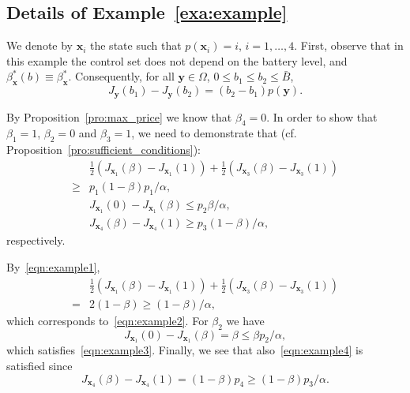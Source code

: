 \documentclass[journal]{IEEEtran}
\newcommand{\Bmax}{\bar{B}}
\newcommand{\bfx}{\boldsymbol x}
\newcommand{\bfy}{\boldsymbol y}
\newcommand\1{\mathbf{1}}
\begin{document}
\subsection{Details of Example~\ref{exa:example}}\label{sec:details_example}

We denote by $\bfx_i$ the state such that $p(\bfx_i) = i$, $i = 1,\dots,4$. First, observe that in this example the control set does not depend on the battery level, and $\beta_{\bfx}^*(b) \equiv \beta_{\bfx}^*$. Consequently, for all $\bfy \in \Omega$, $0 \le b_1 \le b_2 \le \Bmax$,
\begin{equation}
J_{\bfy}(b_1) - J_{\bfy}(b_2) = (b_2 - b_1)p(\bfy). \label{eqn:example1}
\end{equation}

By Proposition~\ref{pro:max_price} we know that $\beta_4 = 0$. In order to show that $\beta_1 = 1$, $\beta_2 = 0$ and $\beta_3 = 1$, we need to demonstrate that (cf. Proposition~\ref{pro:sufficient_conditions}):
\begin{align}
\nonumber &\frac{1}{2}(J_{\bfx_1}(\beta) - J_{\bfx_1}(1)) + \frac{1}{2}(J_{\bfx_3}(\beta) - J_{\bfx_3}(1))\\
\ge{}& p_1(1 - \beta) p_1/\alpha,\label{eqn:example2}\\
&J_{\bfx_1}(0) - J_{\bfx_1}(\beta) \le p_2 \beta /\alpha,\label{eqn:example3}\\
&J_{\bfx_4}(\beta) - J_{\bfx_4}(1) \ge p_3 (1 - \beta)/\alpha,\label{eqn:example4}
\end{align}
respectively.

By~\eqref{eqn:example1},
\begin{align*}
&\frac{1}{2}(J_{\bfx_1}(\beta) - J_{\bfx_1}(1)) + \frac{1}{2}(J_{\bfx_3}(\beta) - J_{\bfx_3}(1))\\
 ={}& 2(1 - \beta) \ge (1 - \beta)/\alpha,
\end{align*}
which corresponds to~\eqref{eqn:example2}. For $\beta_2$ we have
\begin{equation*}
J_{\bfx_1}(0) - J_{\bfx_1}(\beta) = \beta \le  \beta p_2/\alpha,
\end{equation*}
which satisfies~\eqref{eqn:example3}. Finally, we see that also~\eqref{eqn:example4} is satisfied since
\begin{equation*}
J_{\bfx_4}(\beta) - J_{\bfx_4}(1) = (1 - \beta) p_4 \ge (1 - \beta) p_3/\alpha.
\end{equation*}
\end{document}

